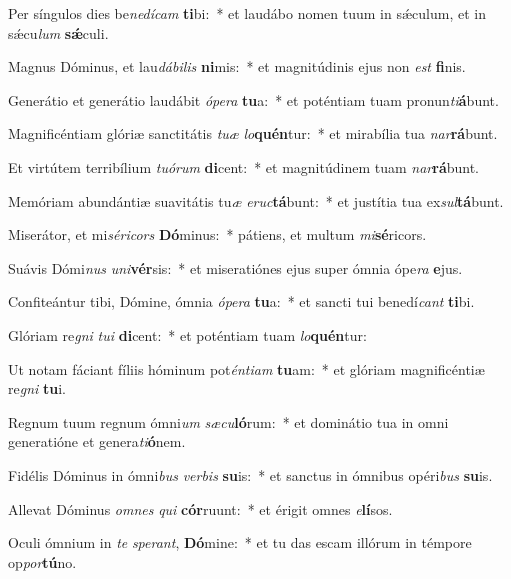 \item Per síngulos dies be\textit{ne}\textit{dí}\textit{cam} \textbf{ti}bi:~* et laudábo nomen tuum in sǽculum, et in sǽcu\textit{lum} \textbf{sǽ}culi.
\item Magnus Dóminus, et lau\textit{dá}\textit{bi}\textit{lis} \textbf{ni}mis:~* et magnitúdinis ejus non \textit{est} \textbf{fi}nis.
\item Generátio et generátio laudábit \textit{ó}\textit{pe}\textit{ra} \textbf{tu}a:~* et poténtiam tuam pronun\textit{ti}\textbf{á}bunt.
\item Magnificéntiam glóriæ sanctitátis \textit{tu}\textit{æ} \textit{lo}\textbf{quén}tur:~* et mirabília tua \textit{nar}\textbf{rá}bunt.
\item Et virtútem terribílium \textit{tu}\textit{ó}\textit{rum} \textbf{di}cent:~* et magnitúdinem tuam \textit{nar}\textbf{rá}bunt.
\item Memóriam abundántiæ suavitátis tu\textit{æ} \textit{e}\textit{ruc}\textbf{tá}bunt:~* et justítia tua ex\textit{sul}\textbf{tá}bunt.
\item Miserátor, et mi\textit{sé}\textit{ri}\textit{cors} \textbf{Dó}minus:~* pátiens, et multum \textit{mi}\textbf{sé}ricors.
\item Suávis Dómi\textit{nus} \textit{u}\textit{ni}\textbf{vér}sis:~* et miseratiónes ejus super ómnia ópe\textit{ra} \textbf{e}jus.
\item Confiteántur tibi, Dómine, ómnia \textit{ó}\textit{pe}\textit{ra} \textbf{tu}a:~* et sancti tui benedí\textit{cant} \textbf{ti}bi.
\item Glóriam re\textit{gni} \textit{tu}\textit{i} \textbf{di}cent:~* et poténtiam tuam \textit{lo}\textbf{quén}tur:
\item Ut notam fáciant fíliis hóminum pot\textit{én}\textit{ti}\textit{am} \textbf{tu}am:~* et glóriam magnificéntiæ re\textit{gni} \textbf{tu}i.
\item Regnum tuum regnum ómni\textit{um} \textit{sæ}\textit{cu}\textbf{ló}rum:~* et dominátio tua in omni generatióne et genera\textit{ti}\textbf{ó}nem.
\item Fidélis Dóminus in ómni\textit{bus} \textit{ver}\textit{bis} \textbf{su}is:~* et sanctus in ómnibus opéri\textit{bus} \textbf{su}is.
\item Allevat Dóminus \textit{om}\textit{nes} \textit{qui} \textbf{cór}ruunt:~* et érigit omnes \textit{e}\textbf{lí}sos.
\item Oculi ómnium in \textit{te} \textit{spe}\textit{rant}, \textbf{Dó}mine:~* et tu das escam illórum in témpore op\textit{por}\textbf{tú}no.
